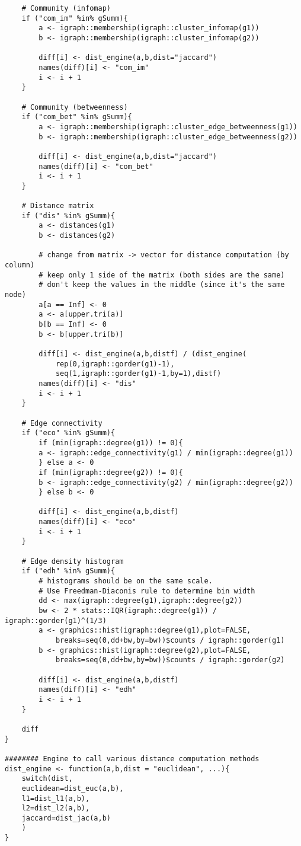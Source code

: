 {\begin{lstlisting}
	# Community (infomap)
	if ("com_im" %in% gSumm){
		a <- igraph::membership(igraph::cluster_infomap(g1))
		b <- igraph::membership(igraph::cluster_infomap(g2))
		
		diff[i] <- dist_engine(a,b,dist="jaccard")
		names(diff)[i] <- "com_im"
		i <- i + 1
	}
	
	# Community (betweenness)
	if ("com_bet" %in% gSumm){
		a <- igraph::membership(igraph::cluster_edge_betweenness(g1))
		b <- igraph::membership(igraph::cluster_edge_betweenness(g2))
		
		diff[i] <- dist_engine(a,b,dist="jaccard")
		names(diff)[i] <- "com_bet"
		i <- i + 1
	}
	
	# Distance matrix 
	if ("dis" %in% gSumm){
	    a <- distances(g1)
	    b <- distances(g2)
	    
	    # change from matrix -> vector for distance computation (by column)
	    # keep only 1 side of the matrix (both sides are the same)
	    # don't keep the values in the middle (since it's the same node)
	    a[a == Inf] <- 0
	    a <- a[upper.tri(a)]
	    b[b == Inf] <- 0
	    b <- b[upper.tri(b)]
	    
	    diff[i] <- dist_engine(a,b,distf) / (dist_engine(
		    rep(0,igraph::gorder(g1)-1),
		    seq(1,igraph::gorder(g1)-1,by=1),distf)
	    names(diff)[i] <- "dis"
	    i <- i + 1
	}
	
	# Edge connectivity 
	if ("eco" %in% gSumm){
		if (min(igraph::degree(g1)) != 0){
		a <- igraph::edge_connectivity(g1) / min(igraph::degree(g1))
		} else a <- 0
		if (min(igraph::degree(g2)) != 0){
		b <- igraph::edge_connectivity(g2) / min(igraph::degree(g2))
		} else b <- 0
		
		diff[i] <- dist_engine(a,b,distf)
		names(diff)[i] <- "eco"
		i <- i + 1
	}
	
	# Edge density histogram
	if ("edh" %in% gSumm){
		# histograms should be on the same scale. 
		# Use Freedman-Diaconis rule to determine bin width
		dd <- max(igraph::degree(g1),igraph::degree(g2))
		bw <- 2 * stats::IQR(igraph::degree(g1)) / igraph::gorder(g1)^(1/3)
		a <- graphics::hist(igraph::degree(g1),plot=FALSE,
			breaks=seq(0,dd+bw,by=bw))$counts / igraph::gorder(g1)
		b <- graphics::hist(igraph::degree(g2),plot=FALSE,
			breaks=seq(0,dd+bw,by=bw))$counts / igraph::gorder(g2)
		
		diff[i] <- dist_engine(a,b,distf)
		names(diff)[i] <- "edh"
		i <- i + 1
	}
	
	diff
}

######## Engine to call various distance computation methods
dist_engine <- function(a,b,dist = "euclidean", ...){
	switch(dist,
	euclidean=dist_euc(a,b),
	l1=dist_l1(a,b),
	l2=dist_l2(a,b),
	jaccard=dist_jac(a,b)
	)
}


\end{lstlisting}}
